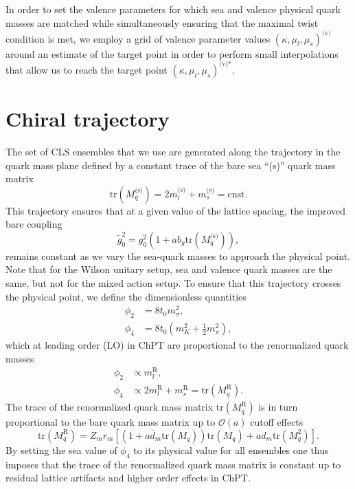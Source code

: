 In order to set the valence parameters for which sea and valence physical quark masses are matched  while simultaneously ensuring that the maximal twist condition is met, we employ a grid of valence parameter values $\left(\kappa,\mu_l,\mu_s\right)^{\textrm{(v)}}$ around an estimate of the target point in order to perform small interpolations that allow us to reach the target point $\left(\kappa,\mu_l,\mu_s\right)^{\textrm{(v)*}}$.


\section{Chiral trajectory}
\label{ch_ma:sec:chiral_traj}

The set of CLS ensembles that we use are generated along the trajectory in the quark mass plane defined by a constant trace of the bare sea ``(s)'' quark mass matrix
\begin{equation}
\label{ch_ma:eq:chiral_traj}
{\textrm{tr}}\left(M_q^{\textrm{(s)}}\right)=2m_{l}^{\textrm{(s)}}+m_{s}^{\textrm{(s)}}={\textrm{cnst}}.
\end{equation}
This trajectory ensures that at a given value of the lattice spacing, the improved bare coupling 
\begin{equation}
\tilde{g}_0^2=g_0^2\left(1+ab_g{\textrm{tr}}\left(M_q^{\textrm{(s)}}\right)\right),
\end{equation}
remains constant as we vary the sea-quark masses to approach the physical point. Note that for the Wilson unitary setup, sea and valence quark masses are the same, but not for the mixed action setup. To ensure that this trajectory crosses the physical point, we define the dimensionless quantities
\begin{align}
\label{ch_ma:eq:phi2}
\phi_2&=8t_0m_{\pi}^2,\\
\label{ch_ma:eq:phi4}
\phi_4&=8t_0\left(m_K^2+\frac{1}{2}m_{\pi}^2\right),
\end{align}
which at leading order (LO) in ChPT are proportional to the renormalized quark masses
\begin{align}
\phi_2&\propto m_l^{\textrm{R}},\\
\phi_4&\propto2m_l^{\textrm{R}}+m_s^{\textrm{R}}={\textrm{tr}}\left(M_q^{\textrm{R}}\right).
\end{align}
The trace of the renormalized quark mass matrix ${\textrm{tr}}\left(M_q^{\textrm{R}}\right)$ is in turn proportional to the bare quark mass matrix up to $\mathcal{O}(a)$ cutoff effects
\begin{equation}
{\textrm{tr}}\left(M_q^{\textrm{R}}\right)=Z_mr_m\left[\left(1+a\bar{d}_m{\textrm{tr}}\left(M_q\right)\right){\textrm{tr}}\left(M_q\right)+ad_m{\textrm{tr}}\left(M_q^2\right)\right].
\end{equation}
By setting the sea value of $\phi_4$ to its physical value for all ensembles one thus imposes that the trace of the renormalized quark mass matrix is constant up to residual lattice artifacts and higher order effects in ChPT.

